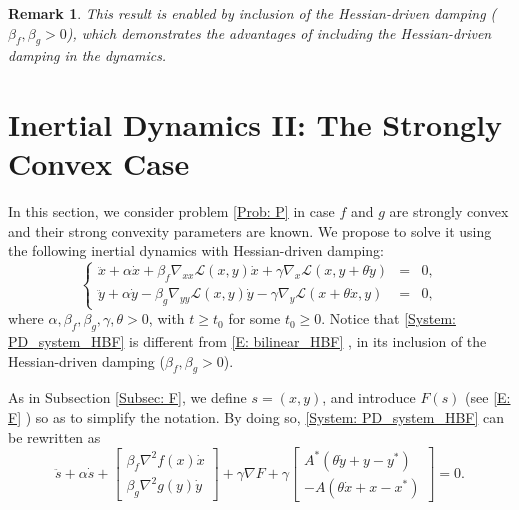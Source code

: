 \documentclass[pdflatex,sn-mathphys-num]{sn-jnl}
\theoremstyle{thmstyleone}
\theoremstyle{thmstyletwo}
\newtheorem{remark}[theorem]{Remark}
\theoremstyle{thmstylethree}
\begin{document}
\begin{remark} 
This result is enabled by inclusion of the Hessian-driven damping ($\beta_f,\beta_g>0$), which demonstrates the advantages of including the Hessian-driven damping in the dynamics.
\end{remark}




\section{Inertial Dynamics II: The Strongly Convex Case}\label{Sec: PD-HBF-H}
In this section, we consider problem \eqref{Prob: P} in case $f$ and $g$ are strongly convex and their strong convexity parameters are known. We propose to solve it using the following inertial dynamics with Hessian-driven damping:
\begin{equation}\label{System: PD_system_HBF}\tag{PD-HBF-H}
\left\{
\begin{array}{lcl}
\ddot{x} + \alpha\dot{x} + \beta_f\nabla_{xx}\mathcal{L}(x,y)\dot{x} + \gamma \nabla_x \mathcal{L}(x,y+\theta\dot{y}) &=& 0,\\[4pt]
\ddot{y} + \alpha\dot{y} - \beta_g\nabla_{yy}\mathcal{L}(x,y)\dot{y} - \gamma \nabla_y \mathcal{L}(x+\theta\dot{x},y) &=& 0,
\end{array} 
\right.
\end{equation}
where $\alpha,\beta_f,\beta_g,\gamma,\theta >0$, with $t\ge t_0$ for some $t_0\ge 0$. Notice that \eqref{System: PD_system_HBF} is different from \eqref{E: bilinear_HBF} \cite{He_2025_PD_SC}, in its inclusion of the Hessian-driven damping ($\beta_f,\beta_g>0$). 

As in Subsection \ref{Subsec: F}, we define $s=(x,y)$, and introduce $F(s)$ (see \eqref{E: F} ) so as to simplify the notation. By doing so, \eqref{System: PD_system_HBF} can be rewritten as
\begin{equation}\label{E: PD_system_HBF}
\ddot{s} + \alpha \dot{s} + \begin{bmatrix}
\beta_f \nabla^2 f(x) \dot{x}\\[2pt]
\beta_g \nabla^2 g(y) \dot{y}
\end{bmatrix} + \gamma \nabla F + \gamma \begin{bmatrix}
A^* ( \theta \dot{y} + y - y^* ) \\[2pt]
- A( \theta\dot{x} + x - x^* )
\end{bmatrix} = 0.
\end{equation} 
\end{document}
